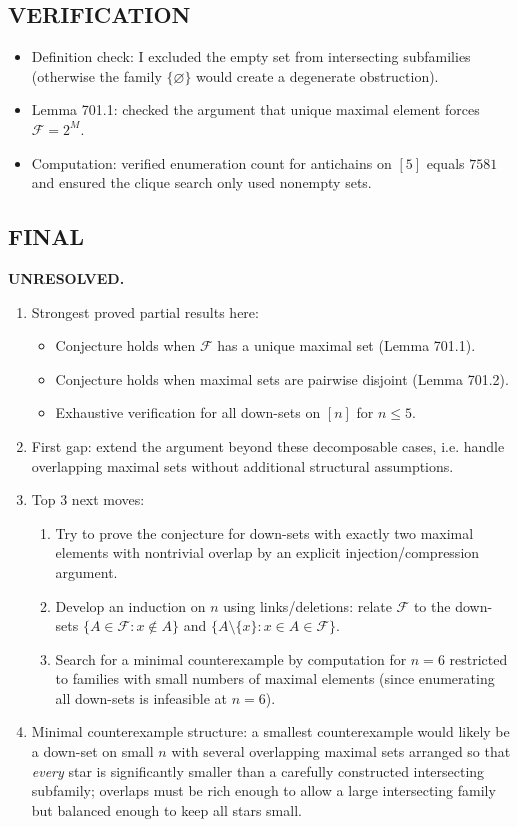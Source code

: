\subsection*{VERIFICATION}
\begin{itemize}
\item Definition check: I excluded the empty set from intersecting subfamilies (otherwise the family $\{\varnothing\}$ would create a degenerate obstruction).
\item Lemma 701.1: checked the argument that unique maximal element forces $\mathcal{F}=2^M$.
\item Computation: verified enumeration count for antichains on $[5]$ equals $7581$ and ensured the clique search only used nonempty sets.
\end{itemize}

\subsection*{FINAL}
\textbf{UNRESOLVED.}
\begin{enumerate}
\item[(i)] Strongest proved partial results here:
  \begin{itemize}
  \item Conjecture holds when $\mathcal{F}$ has a unique maximal set (Lemma 701.1).
  \item Conjecture holds when maximal sets are pairwise disjoint (Lemma 701.2).
  \item Exhaustive verification for all down-sets on $[n]$ for $n\le 5$.
  \end{itemize}
\item[(ii)] First gap: extend the argument beyond these decomposable cases, i.e. handle overlapping maximal sets without additional structural assumptions.
\item[(iii)] Top 3 next moves:
  \begin{enumerate}
  \item Try to prove the conjecture for down-sets with exactly two maximal elements with nontrivial overlap by an explicit injection/compression argument.
  \item Develop an induction on $n$ using links/deletions: relate $\mathcal{F}$ to the down-sets $\{A\in\mathcal{F}: x\notin A\}$ and $\{A\setminus\{x\}: x\in A\in\mathcal{F}\}$.
  \item Search for a minimal counterexample by computation for $n=6$ restricted to families with small numbers of maximal elements (since enumerating all down-sets is infeasible at $n=6$).
  \end{enumerate}
\item[(iv)] Minimal counterexample structure: a smallest counterexample would likely be a down-set on small $n$ with several overlapping maximal sets arranged so that \emph{every} star is significantly smaller than a carefully constructed intersecting subfamily; overlaps must be rich enough to allow a large intersecting family but balanced enough to keep all stars small.
\end{enumerate}



